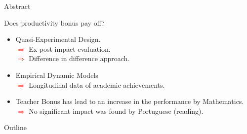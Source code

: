 \documentclass{beamer}
\begin{document}
\long{}


\begin{frame}{Abstract}
\begin{block}{\centering Does productivity bonus pay off?}
\begin{itemize}
\item \footnotesize Quasi-Experimental Design.
\\ \tiny \textcolor{red}{$\Longrightarrow$} Ex-post impact evaluation.
\\ \tiny \textcolor{red}{$\Longrightarrow$} Difference in difference approach.
\item \footnotesize Empirical Dynamic Models
\\ \tiny\textcolor{red}{$\Longrightarrow$} Longitudinal data of academic achievements.
\item \footnotesize Teacher Bonus has lead to an increase in the performance by Mathematics.
\\ \tiny\textcolor{red}{$\Longrightarrow$} No significant impact was found by Portuguese (reading).
\end{itemize}
\end{block}
\end{frame}

 

\begin{frame}[label=Outline]{Outline}
\vspace{-37pt} \flushright \hyperlink{Mirror}{\beamerbutton{\textcolor{red}{Appendix}}}
\vspace{15pt}
\begin{flushleft}
  \tableofcontents
\end{flushleft}
\end{frame}
\end{document}

